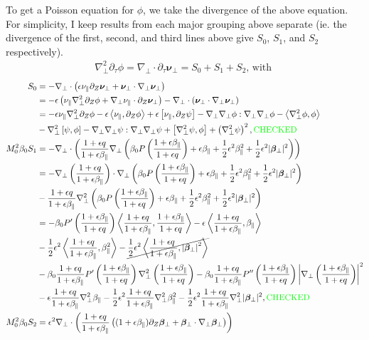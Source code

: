 \documentclass{article}
\newcommand{\para}{\parallel}
\newcommand{\ep}{\epsilon}
\newcommand{\np}{\nabla_\perp}
\newcommand{\p}{\partial}
\newcommand{\fr}{\frac{1+\ep q}{1+\ep\beta_\para}}
\newcommand{\frinv}{\frac{1+\ep\beta_\para}{1+\ep q}}
\newcommand{\pth} [1] {\left( #1 \right) }
\newcommand{\br} [1] {\left[ #1 \right] }
\begin{document}
To get a Poisson equation for $\phi$, we take the divergence of the above equation. For simplicity, I keep results from each major grouping above separate (ie. the divergence of the first, second, and third lines above give $S_0$, $S_1$, and $S_2$ respectively). 
\begin{align} \label{phievolution} 
    \np^2\p_\tau\phi = \np\cdot \p_\tau \bm{\nu}_\perp = S_0 + S_1 + S_2 \text{, with }
\end{align}
\begin{align*}
    S_0 &= -\np \cdot \pth{ \ep\nu_\para \p_Z \bm{\nu}_\perp + \bm{\nu}_\perp \cdot\np \bm{\nu}_\perp}  \\ 
        &= - \ep\pth{\nu_\para \np^2 \p_Z\phi + \np\nu_\para \cdot \p_Z\bm{\nu}_\perp} - \np\cdot \pth{\bm{\nu}_\perp \cdot \np \bm{\nu}_\perp} \\ 
        &= -\ep\nu_\para \np^2 \p_Z\phi - \ep\Braket{\nu_\para, \p_Z\phi} + \ep\br{\nu_\para, \p_Z\psi} - \np\np\phi:\np\np\phi - \Braket{\np^2\phi, \phi} \\ 
        &- \np^2\br{\psi,\phi} - \np\np\psi:\np\np\psi + \br{\np^2\psi, \phi} + \pth{\np^2\psi}^2, \text{\color{green}CHECKED} \\ 
    M_0^2\beta_0 S_1 &= -\np \cdot \pth{\fr \np \pth{\beta_0 P\pth{\frinv} + \ep \beta_\para + \frac{1}{2}\ep^2 \beta_\para^2 + \frac{1}{2}\ep^2 |\bm{\beta}_\perp|^2} } \\ 
    &= -\np \pth{\fr} \cdot \np\pth{\beta_0 P\pth{\frinv} + \ep \beta_\para + \frac{1}{2}\ep^2 \beta_\para^2 + \frac{1}{2}\ep^2 |\bm{\beta}_\perp|^2} \\ 
    &- \fr \np^2\pth{\beta_0 P\pth{\frinv} + \ep \beta_\para + \frac{1}{2}\ep^2 \beta_\para^2 + \frac{1}{2}\ep^2 |\bm{\beta}_\perp|^2} \\ 
        &= -\beta_0P'\pth{\frinv} \Braket{\fr, \frinv} - \ep\Braket{\fr, \beta_\para} \\ 
        &- \frac{1}{2}\ep^2\Braket{\fr, \beta_\para^2} - \cancel{\frac{1}{2}\ep^2 \Braket{\fr, \left|\bm{\beta}_\perp\right|^2}} \\ 
        &- \beta_0\fr P'\pth{\frinv}\np^2\pth{\frinv} - \beta_0\fr P''\pth{\frinv} \left| \np\pth{\frinv} \right|^2 \\ 
        &- \ep\fr\np^2\beta_\para - \frac{1}{2}\ep^2\fr\np^2 \beta_\para^2 - \frac{1}{2}\ep^2\fr\np^2 |\bm{\beta}_\perp|^2, \text{\color{green}CHECKED} \\ 
    M_0^2\beta_0 S_2 &= \ep^2 \np\cdot \pth{\fr \pth{(1+\ep\beta_\para) \p_Z \bm{\beta}_\perp + \bm{\beta}_\perp \cdot\np \bm{\beta}_\perp}} \\

\end{align*}
\end{document}

